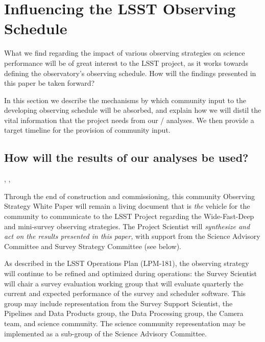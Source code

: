 
\section{Influencing the LSST Observing Schedule}
\label{sec:\secname:schedule}

What we find regarding the impact of various observing strategies on
science performance will be of great interest to the LSST project, as it
works towards defining the observatory's observing schedule. How will
the findings presented in this paper be taken forward?

In this section we describe the mechanisms by which community input to
the developing observing schedule will be absorbed, and explain how
we will distil the vital information that the project needs from our
\OpSim / \MAF analyses. We then provide a target timeline for the provision of community input.


\subsection{How will the results of our analyses be used?}
\label{sec:\secname:useage}

, , 

Through the end of construction and commissioning, this community
Observing Strategy White Paper will remain a living document that is
{\it the} vehicle for the community to communicate to the LSST Project
regarding the Wide-Fast-Deep and mini-survey observing strategies.
The Project Scientist will {\it synthesize and act on the results
presented in this paper,} with support from the Science Advisory
Committee and Survey Strategy Committee (see below).

As described in the LSST Operations Plan (LPM-181), the observing
strategy will continue to be refined and optimized during operations:
the Survey Scientist will chair a survey evaluation working group that
will evaluate quarterly the current and expected performance of the
survey and scheduler software. This group may include representation
from the Survey Support Scientist, the Pipelines and Data Products
group, the Data Processing group, the Camera team, and science
community.  The science community representation may be implemented as a
sub-group of the Science Advisory Committee.

